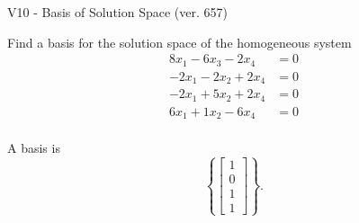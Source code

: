 \begin{exercise}
  \begin{exerciseTitle}V10 - Basis of Solution Space (ver. 657)\end{exerciseTitle}
  \begin{exerciseStatement}
    Find a basis for the solution space of the homogeneous system 
\begin{align*}
 8 x_ 1 -6 x_ 3 -2 x_ 4 &= 0  \\ 
  -2 x_ 1 -2 x_ 2 + 2 x_ 4 &= 0  \\ 
  -2 x_ 1 + 5 x_ 2 + 2 x_ 4 &= 0  \\ 
  6 x_ 1 + 1 x_ 2 -6 x_ 4 &= 0  \\ 
 \end{align*}


 
  \end{exerciseStatement}

  \begin{exerciseAnswer}
   A basis is   
\[\left\{\left[\begin{array}{c}
1 \\
0 \\
1 \\
1
\end{array}\right]\right\}.\]

  


  \end{exerciseAnswer}
\end{exercise}
